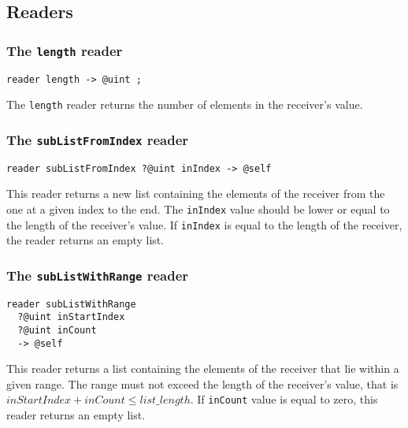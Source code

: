 \subsection{Readers}

\subsubsection{The \lstinline[language=galgas]!length! reader}

\begin{lstlisting}[language=galgas]
reader length -> @uint ;
\end{lstlisting}

The \lstinline[language=galgas]!length! reader returns the number of elements in the receiver's value.




\subsubsection{The \lstinline[language=galgas]!subListFromIndex! reader}

\begin{lstlisting}[language=galgas]
reader subListFromIndex ?@uint inIndex -> @self
\end{lstlisting}

This reader returns a new list containing the elements of the receiver from the one at a given index to the end. The  \lstinline[language=galgas]!inIndex! value should be lower or equal to the length of the receiver's value. If \lstinline[language=galgas]!inIndex! is equal to the length of the receiver, the reader returns an empty list.





\subsubsection{The \lstinline[language=galgas]!subListWithRange! reader}

\begin{lstlisting}[language=galgas]
reader subListWithRange
  ?@uint inStartIndex
  ?@uint inCount
  -> @self
\end{lstlisting}

This reader returns a list containing the elements of the receiver that lie within a given range. The range must not exceed the length of the receiver's value, that is $inStartIndex + inCount \leqslant list\_length$. If \lstinline[language=galgas]!inCount! value is equal to zero, this reader returns an empty list.





